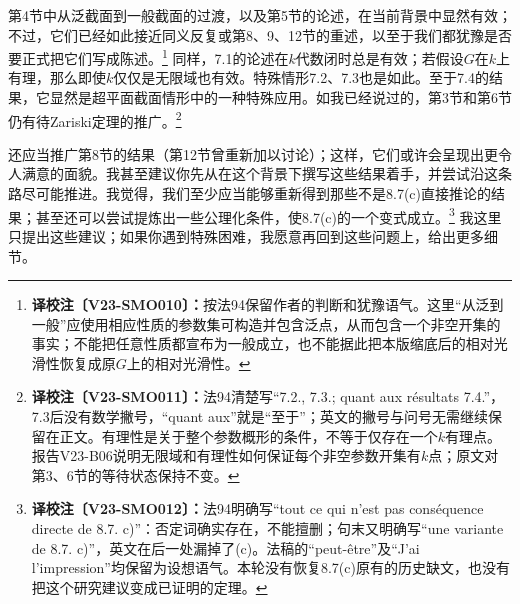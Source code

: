 \documentclass[UTF8,a4paper]{ctexbook}
\newcommand{\cmt}[2]{\footnote{\textbf{译校注〔#1〕：}#2}}
\begin{document}
第4节中从泛截面到一般截面的过渡，以及第5节的论述，在当前背景中显然有效；不过，它们已经如此接近同义反复或第8、9、12节的重述，以至于我们都犹豫是否要正式把它们写成陈述。\cmt{V23-SMO010}{按法94保留作者的判断和犹豫语气。这里“从泛到一般”应使用相应性质的参数集可构造并包含泛点，从而包含一个非空开集的事实；不能把任意性质都宣布为一般成立，也不能据此把本版缩底后的相对光滑性恢复成原$G$上的相对光滑性。}
同样，7.1的论述在$k$代数闭时总是有效；若假设$G$在$k$上有理，那么即使$k$仅仅是无限域也有效。特殊情形7.2、7.3也是如此。至于7.4的结果，它显然是超平面截面情形中的一种特殊应用。如我已经说过的，第3节和第6节仍有待Zariski定理的推广。\cmt{V23-SMO011}{法94清楚写“7.2., 7.3.; quant aux résultats 7.4.”，7.3后没有数学撇号，“quant aux”就是“至于”；英文的撇号与问号无需继续保留在正文。有理性是关于整个参数概形的条件，不等于仅存在一个$k$有理点。报告V23-B06说明无限域和有理性如何保证每个非空参数开集有$k$点；原文对第3、6节的等待状态保持不变。}

还应当推广第8节的结果（第12节曾重新加以讨论）；这样，它们或许会呈现出更令人满意的面貌。我甚至建议你先从在这个背景下撰写这些结果着手，并尝试沿这条路尽可能推进。我觉得，我们至少应当能够重新得到那些不是8.7(c)直接推论的结果；甚至还可以尝试提炼出一些公理化条件，使8.7(c)的一个变式成立。\cmt{V23-SMO012}{法94明确写“tout ce qui n'est pas conséquence directe de 8.7. c)”：否定词确实存在，不能擅删；句末又明确写“une variante de 8.7. c)”，英文在后一处漏掉了(c)。法稿的“peut-être”及“J'ai l'impression”均保留为设想语气。本轮没有恢复8.7(c)原有的历史缺文，也没有把这个研究建议变成已证明的定理。}
我这里只提出这些建议；如果你遇到特殊困难，我愿意再回到这些问题上，给出更多细节。
\end{document}
